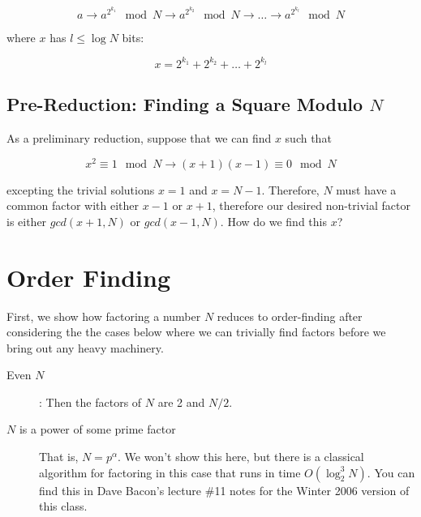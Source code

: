\documentclass[12pt]{article}
\begin{document}
\begin{displaymath}
a \rightarrow a^{2^{k_1}} \mod N \rightarrow a^{2^{k_2}} \mod N \rightarrow \ldots
\rightarrow a^{2^{k_l}} \mod N
\end{displaymath}

where $x$ has $l \le \log N$ bits:

\begin{displaymath}
x = 2^{k_1} + 2^{k_2} + \ldots + 2^{k_l}
\end{displaymath}

\subsection{Pre-Reduction: Finding a Square Modulo $N$}

As a preliminary reduction, suppose that we can find $x$ such that

\begin{displaymath}
x^2 \equiv 1 \mod N \rightarrow (x + 1)(x - 1) \equiv 0 \mod N
\end{displaymath}

excepting the trivial solutions $x = 1$ and $x = N-1$.
Therefore, $N$ must have a common factor with either $x-1$ or $x+1$, therefore
our desired non-trivial factor is either $gcd(x+1,N)$ or $gcd(x-1,N)$.
How do we find this $x$?

\section{Order Finding}

First, we show how factoring a number $N$
reduces to order-finding after considering the
the cases below where we can trivially find factors before we bring out
any heavy machinery.

\begin{description}
\item[Even $N$]:
Then the factors of $N$ are 2 and $N/2$.
\item[$N$ is a power of some prime factor]

That is, $N = p^\alpha$.
We won't show this here, but there is a classical algorithm for
factoring in this case that runs in time $O(\log_2^3 N)$.
You can find this in Dave Bacon's lecture \#11
notes for the Winter 2006 version of this class.

\end{description}
\end{document}
